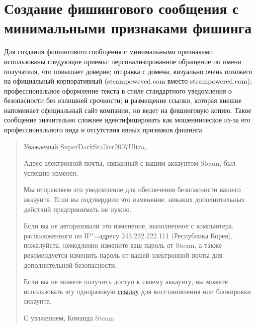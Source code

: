 \documentclass{bsuir}
\begin{document}
\section{Создание фишингового сообщения с минимальными признаками фишинга}

Для создания фишингового сообщения с минимальными признаками использованы следующие приемы:
персонализированное обращение по имени получателя, что повышает доверие; отправка с домена,
визуально очень похожего на официальный корпоративный (steampoweved.com вместо steampowered.com);
профессиональное оформление текста в стиле стандартного уведомления о безопасности без излишней
срочности; и размещение ссылки, которая внешне напоминает официальный сайт компании, но ведет на
фишинговую копию. Такое сообщение значительно сложнее идентифицировать как мошенническое из-за его
профессионального вида и отсутствия явных признаков фишинга.

\begin{quote}
Уважаемый SuperDarkStalker2007Ultra,

Адрес электронной почты, связанный с вашим аккаунтом Steam, был успешно изменён.

Мы отправляем это уведомление для обеспечения безопасности вашего аккаунта. Если вы подтвердили это изменение, никаких дополнительных действий предпринимать не нужно.

Если вы не авторизовали это изменение, выполненное с компьютера, расположенного по IP"=адресу 243.232.222.111 (Республика Корея), пожалуйста, немедленно измените ваш пароль от Steam, а также рекомендуется изменить пароль от вашей электронной почты для дополнительной безопасности.

Если вы не можете получить доступ к своему аккаунту, вы можете использовать эту одноразовую \url{ссылку} для восстановления или блокировки аккаунта.

С уважением,
Команда Steam
\end{quote}
\end{document}
